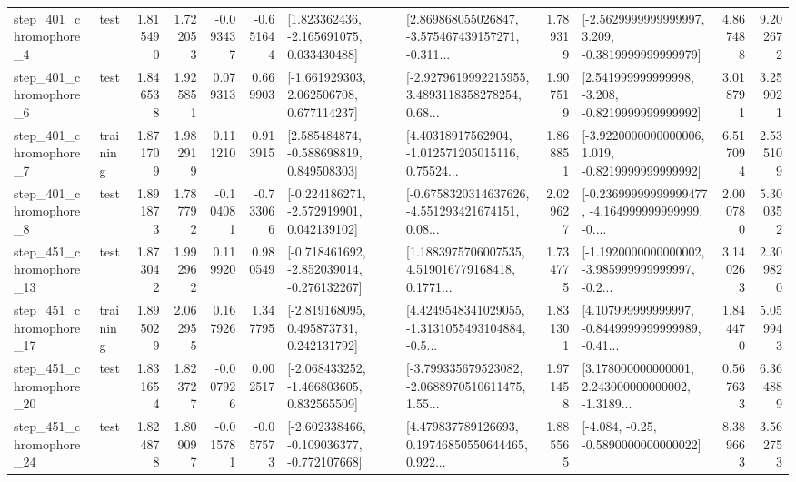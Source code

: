 \begin{tabular}{llrrrrllrlrr}
   step\_401\_chromophore\_4 &      test &      1.815490 &    1.722053 &     -0.093437 & -0.651644 &    [1.823362436, -2.165691075, 0.033430488] &  [2.869868055026847, -3.575467439157271, -0.311... &       1.789319 &  [-2.5629999999999997, 3.209, -0.3819999999999979] &            4.867488 &          9.202672 \\
   step\_401\_chromophore\_6 &      test &      1.846538 &    1.925851 &      0.079313 &  0.669903 &    [-1.661929303, 2.062506708, 0.677114237] &  [-2.9279619992215955, 3.4893118358278254, 0.68... &       1.907519 &   [2.541999999999998, -3.208, -0.8219999999999992] &            3.018791 &          3.259021 \\
   step\_401\_chromophore\_7 &  training &      1.871709 &    1.982919 &      0.111210 &  0.913915 &    [2.585484874, -0.588698819, 0.849508303] &  [4.40318917562904, -1.012571205015116, 0.75524... &       1.868851 &  [-3.9220000000000006, 1.019, -0.8219999999999992] &            6.517094 &          2.535109 \\
   step\_401\_chromophore\_8 &      test &      1.891873 &    1.787792 &     -0.104081 & -0.733066 &   [-0.224186271, -2.572919901, 0.042139102] &  [-0.6758320314637626, -4.551293421674151, 0.08... &       2.029627 &  [-0.23699999999999477, -4.164999999999999, -0.... &            2.000780 &          5.300352 \\
  step\_451\_chromophore\_13 &      test &      1.873042 &    1.992962 &      0.119920 &  0.980549 &  [-0.718461692, -2.852039014, -0.276132267] &  [1.1883975706007535, 4.519016779168418, 0.1771... &       1.734775 &  [-1.1920000000000002, -3.985999999999997, -0.2... &            3.140263 &          2.309820 \\
  step\_451\_chromophore\_17 &  training &      1.895029 &    2.062955 &      0.167926 &  1.347795 &    [-2.819168095, 0.495873731, 0.242131792] &  [4.4249548341029055, -1.3131055493104884, -0.5... &       1.831301 &  [4.107999999999997, -0.8449999999999989, -0.41... &            1.844470 &          5.059943 \\
  step\_451\_chromophore\_20 &      test &      1.831654 &    1.823727 &     -0.007926 &  0.002517 &   [-2.068433252, -1.466803605, 0.832565509] &  [-3.799335679523082, -2.0688970510611475, 1.55... &       1.971458 &  [3.178000000000001, 2.243000000000002, -1.3189... &            0.567633 &          6.364889 \\
  step\_451\_chromophore\_24 &      test &      1.824878 &    1.809097 &     -0.015781 & -0.057573 &  [-2.602338466, -0.109036377, -0.772107668] &  [4.479837789126693, 0.19746850550644465, 0.922... &       1.885565 &               [-4.084, -0.25, -0.5890000000000022] &            8.389663 &          3.562753 \\

\end{tabular}
